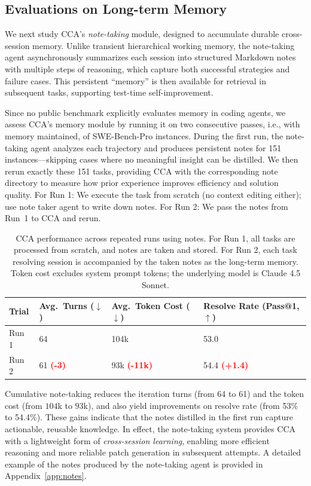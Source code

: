 \subsection{Evaluations on Long-term Memory}

We next study CCA’s \emph{note-taking} module, designed to accumulate durable cross-session memory. Unlike transient hierarchical working memory, the note-taking agent asynchronously summarizes each session into structured Markdown notes with multiple steps of reasoning, which capture both successful strategies and failure cases. This persistent ``memory'' is then available for retrieval in subsequent tasks, supporting test-time self-improvement.

Since no public benchmark explicitly evaluates memory in coding agents, we assess CCA’s memory module by running it on two consecutive passes, i.e., with memory maintained, of SWE-Bench-Pro instances. During the first run, the note-taking agent analyzes each trajectory and produces persistent notes for 151 instances—skipping cases where no meaningful insight can be distilled. We then rerun exactly these 151 tasks, providing CCA with the corresponding note directory to measure how prior experience improves efficiency and solution quality.
For Run 1: We execute the task from scratch (no context editing either); use note taker agent to write  down notes. For Run 2: We pass the notes from Run~1 to CCA and rerun.

\begin{table}[h]
\centering
\small
\begin{tabular}{l l l l}
\toprule
\textbf{Trial} & \textbf{Avg.\ Turns ($\downarrow$)} & \textbf{Avg.\ Token Cost ($\downarrow$)} & \textbf{Resolve Rate (Pass@1, $\uparrow$)} \\
\midrule
Run 1 & 64 & 104k & 53.0 \\
Run 2 & 61 \textcolor{red}{\textbf{(-3)}} & 93k \textcolor{red}{\textbf{(-11k)}} & 54.4 \textcolor{red}{\textbf{(+1.4)}} \\
\bottomrule
\end{tabular}
\caption{CCA performance across repeated runs using notes. For Run 1, all tasks are processed from scratch, and notes are taken and stored. For Run 2, each task resolving session is accompanied by the taken notes as the long-term memory. Token cost excludes system prompt tokens; the underlying model is Claude 4.5 Sonnet.}
\label{tab:note_ablation}
\end{table}

Cumulative note-taking reduces the iteration turns (from 64 to 61) and the token cost (from $104$k to $93$k), and also yield improvements on resolve rate (from 53\% to 54.4\%). These gains indicate that the notes distilled in the first run capture actionable, reusable knowledge. In effect, the note-taking system provides CCA with a lightweight form of \emph{cross-session learning}, enabling more efficient reasoning and more reliable patch generation in subsequent attempts. A detailed example of the notes produced by the note-taking agent is provided in Appendix~\ref{app:notes}. 


